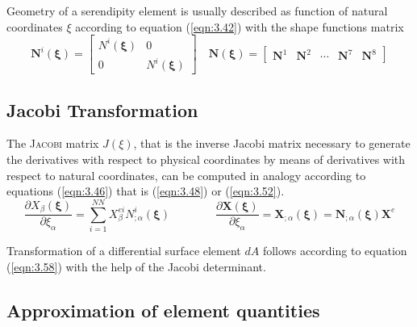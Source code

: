 {Geometry of a serendipity element is usually described as function of natural coordinates $\xi$
according to equation (\ref{eqn:3.42}) with the shape functions matrix
\begin{equation}
 \mathbf{N}^{i}(\boldsymbol{\xi})=\left[\begin{array}{cc}N^{i}(\boldsymbol{\xi}) & 0 \\ 0 & N^{i}(\boldsymbol{\xi})\end{array}\right] \quad \mathbf{N}(\boldsymbol{\xi})=\left[\begin{array}{ccccc}\mathbf{N}^{1} & \mathbf{N}^{2} & \cdots & \mathbf{N}^{7} & \mathbf{N}^{8}\end{array}\right] 
 \label{eqn:3.152} 
\end{equation}

\subsection{Jacobi Transformation}
The \textsc{Jacobi} matrix $J(\xi)$, that is the inverse Jacobi matrix necessary to generate the derivatives with respect to physical coordinates by means of derivatives with respect to natural coordinates,
can be computed in analogy according to equations (\ref{eqn:3.46}) that is (\ref{eqn:3.48}) or
(\ref{eqn:3.52}).
\begin{equation}
 \frac{\partial X_{\beta}(\boldsymbol{\xi})}{\partial \xi_{\alpha}}=\sum_{i=1}^{N N} X_{\beta}^{e i} N_{; \alpha}^{i}(\boldsymbol{\xi}) \qquad \qquad \frac{\partial \boldsymbol{X}(\boldsymbol{\xi})}{\partial \xi_{\alpha}}=\boldsymbol{X}_{; \alpha}(\boldsymbol{\xi})=\mathbf{N}_{; \alpha}(\boldsymbol{\xi}) \boldsymbol{X}^{e} 
 \label{eqn:3.143} 
\end{equation}

Transformation of a differential surface element $dA$ follows according to equation (\ref{eqn:3.58}) with the help of the Jacobi determinant.
\subsection{Approximation of element quantities}

}
